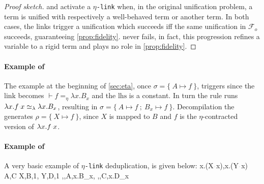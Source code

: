 \documentclass[sigconf,natbib=false,review]{acmart}
\newcommand{\appsep}{\ensuremath{\textcolor{lightgray}{\cdot}}}
\newcommand{\UnifRel}{\ensuremath{\simeq}}
\newcommand{\Ue}{\ensuremath{\UnifRel_\lambda}\xspace}
\newcommand{\linkMacro}[1]{\ensuremath{#1}\texttt{-link}\xspace}
\newcommand{\linketa} {\linkMacro{\eta}}
\newcommand{\Fo}{\ensuremath{\mathcal{F}_{\!o}\xspace}} %
\newcommand{\linketaM}[3]{\ensuremath{#1 \vdash #2 =_\eta #3}}
\newcommand{\lhs}{\ensuremath{\mathrm{lhs}}\xspace}
\begin{document}
\begin{proof}[Proof sketch]
  \progressetaleft and \progressetadedup activate a \linketa when, in the
  original unification problem, a \maybeeta term is unified with respectively a
  well-behaved term or another \maybeeta term. In both cases, the links trigger
  a unification which succeeds iff the same unification in \Fo{} succeeds,
  guaranteeing \cref{prop:fidelity}. \progressetaright never fails, in fact,
  this progression refines a variable to a rigid term and plays no role in 
  \cref{prop:fidelity}.
\end{proof}

\paragraph{Example of \progressetaleft}

The example at the beginning of \cref{sec:eta}, once
$\sigma = \{~ A \mapsto f ~\}$, triggers \progressetaleft since the link
becomes \linketaM{}{f}{\lambda x.B_{x}} and the \lhs is a constant.
In turn the rule runs $\lambda x.f \appsep x \Ue{} \lambda x.B_{x}$,
resulting in $\sigma = \{~ A \mapsto f ~;~ B_{x} \mapsto f ~\}$.
Decompilation the generates $\rho = \{~ X \mapsto f ~\}$, since
$X$ is mapped to $B$ and
$f$ is the $\eta$-contracted version of $\lambda x.f \appsep x$.

\paragraph{Example of \progressetadedup}

A very basic example of \linketa deduplication, is given below:
\printAlll
  {{{\lambda x.(X\appsep x),\lambda x.(Y\appsep x)}}}
  {{{A,C}}}
  {{{X,B,1},
    {Y,D,1}}}
  {{{\eta,,A,\lambda x.B_{x}},
    {\eta,,C,\lambda x.D_{x}}}}
\end{document}
